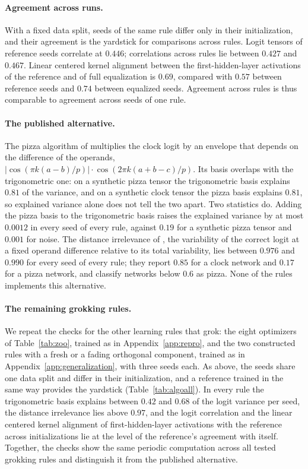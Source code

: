\documentclass{article} %
\begin{document}
\paragraph{Agreement across runs.} With a fixed data split, seeds of the same rule differ only in their initialization, and their agreement is the yardstick for comparisons across rules. Logit tensors of reference seeds correlate at $0.446$; correlations across rules lie between $0.427$ and $0.467$. Linear centered kernel alignment between the first-hidden-layer activations of the reference and of full equalization is $0.69$, compared with $0.57$ between reference seeds and $0.74$ between equalized seeds. Agreement across rules is thus comparable to agreement across seeds of one rule.

\paragraph{The published alternative.} The pizza algorithm of \citet{zhong2023clock} multiplies the clock logit by an envelope that depends on the difference of the operands, $\lvert\cos(\pi k(a-b)/p)\rvert \cdot \cos(2\pi k(a+b-c)/p)$. Its basis overlaps with the trigonometric one: on a synthetic pizza tensor the trigonometric basis explains $0.81$ of the variance, and on a synthetic clock tensor the pizza basis explains $0.81$, so explained variance alone does not tell the two apart. Two statistics do. Adding the pizza basis to the trigonometric basis raises the explained variance by at most $0.0012$ in every seed of every rule, against $0.19$ for a synthetic pizza tensor and $0.001$ for noise. The distance irrelevance of \citet{zhong2023clock}, the variability of the correct logit at a fixed operand difference relative to its total variability, lies between $0.976$ and $0.990$ for every seed of every rule; they report $0.85$ for a clock network and $0.17$ for a pizza network, and classify networks below $0.6$ as pizza. None of the rules implements this alternative.

\paragraph{The remaining grokking rules.} We repeat the checks for the other learning rules that grok: the eight optimizers of Table~\ref{tab:zoo}, trained as in Appendix~\ref{app:repro}, and the two constructed rules with a fresh or a fading orthogonal component, trained as in Appendix~\ref{app:generalization}, with three seeds each. As above, the seeds share one data split and differ in their initialization, and a reference trained in the same way provides the yardstick (Table~\ref{tab:algoall}). In every rule the trigonometric basis explains between $0.42$ and $0.68$ of the logit variance per seed, the distance irrelevance lies above $0.97$, and the logit correlation and the linear centered kernel alignment of first-hidden-layer activations with the reference across initializations lie at the level of the reference's agreement with itself. Together, the checks show the same periodic computation across all tested grokking rules and distinguish it from the published alternative.
\end{document}
